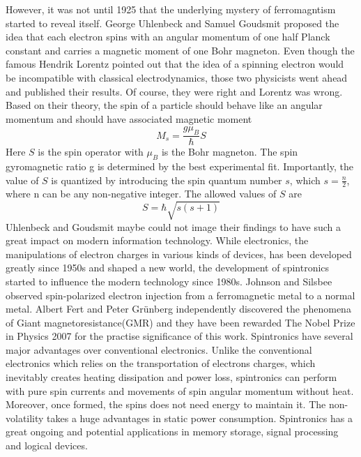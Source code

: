 However, it was not until 1925 that the underlying mystery of ferromagntism started to reveal itself. George Uhlenbeck and Samuel Goudsmit\cite{UHLENBECK1926} proposed the idea that each electron spins with an angular momentum of one half Planck constant and carries a magnetic moment of one Bohr magneton. Even though the famous Hendrik Lorentz pointed out that the idea of a spinning electron would be incompatible with classical electrodynamics, those two physicists went ahead and published their results. Of course, they were right and Lorentz was wrong. Based on their theory, the spin of a particle should behave like an angular momentum and should have associated magnetic moment
\begin{equation}
	\label{eq:spin}
	M_s = \frac{g\mu_B}{\hbar}S
\end{equation}
Here $S$ is the spin operator with $\mu_B$ is the Bohr magneton. The spin gyromagnetic ratio g is determined by the best experimental fit. Importantly, the value of $S$ is quantized by introducing the spin quantum number $s$, which $s = \frac{n}{2}$, where n can be any non-negative integer. The allowed values of $S$ are
\begin{equation}
	\label{eq:spinquantum}
	S = \hbar \sqrt{s(s+1)}
\end{equation}
Uhlenbeck and Goudsmit maybe could not image their findings to have such a great impact on modern information technology. While electronics, the manipulations of electron charges in various kinds of devices, has been developed greatly since 1950s and shaped a new world, the development of spintronics started to influence the modern technology since 1980s. Johnson and Silsbee\cite{JohnsonandSilsbee} observed spin-polarized electron injection from a ferromagnetic metal to a normal metal.  Albert Fert\cite{Fert} and Peter Gr\"unberg\cite{Grunberg} independently discovered the phenomena of Giant magnetoresistance(GMR) and they have been rewarded The Nobel Prize in Physics 2007 for the practise significance of this work. Spintronics have several major advantages over conventional electronics. Unlike the conventional electronics which relies on the transportation of electrons charges, which inevitably creates heating dissipation and power loss, spintronics can perform with pure spin currents and movements of spin angular momentum without heat. Moreover, once formed, the spins does not need energy to maintain it. The non-volatility takes a huge advantages in static power consumption. Spintronics has a great ongoing and potential applications in memory storage, signal processing and logical devices.

